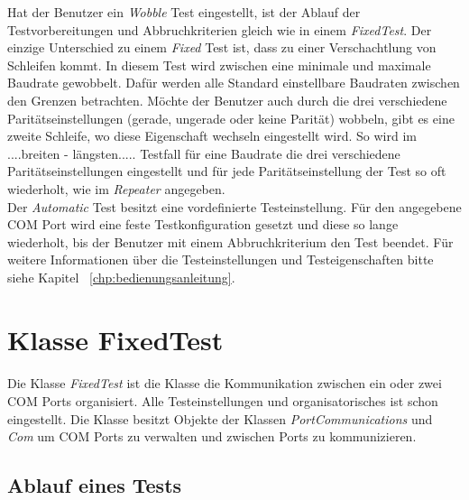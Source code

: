 Hat der Benutzer ein \textit{Wobble} Test eingestellt, ist der Ablauf der Testvorbereitungen und Abbruchkriterien gleich wie in einem \textit{FixedTest}. Der einzige Unterschied zu einem \textit{Fixed} Test ist, dass zu einer Verschachtlung von Schleifen kommt. In diesem Test wird zwischen eine minimale und maximale Baudrate gewobbelt. Dafür werden alle Standard einstellbare Baudraten zwischen den Grenzen betrachten. Möchte der Benutzer auch durch die drei verschiedene Paritätseinstellungen (gerade, ungerade oder keine Parität) wobbeln, gibt es eine zweite Schleife, wo diese Eigenschaft wechseln eingestellt wird. So wird im ....breiten - längsten..... Testfall für eine  Baudrate die drei verschiedene Paritätseinstellungen eingestellt und für jede Paritätseinstellung der Test so oft wiederholt, wie im \textit{Repeater} angegeben.\\

Der \textit{Automatic} Test besitzt eine vordefinierte Testeinstellung. Für den angegebene COM Port wird eine feste Testkonfiguration gesetzt und diese so lange wiederholt, bis der Benutzer mit einem Abbruchkriterium den Test beendet. Für weitere Informationen über die Testeinstellungen und Testeigenschaften bitte siehe Kapitel ~\ref{chp:bedienungsanleitung}.

\newpage


\section{Klasse FixedTest}\label{FixedTextClass}
\paragraph{}
Die Klasse \textit{FixedTest} ist die Klasse die Kommunikation zwischen ein oder zwei COM Ports organisiert. Alle Testeinstellungen und organisatorisches ist schon eingestellt. Die Klasse besitzt Objekte der Klassen \textit{PortCommunications} und \textit{Com} um COM Ports zu verwalten und zwischen Ports zu kommunizieren.\\

\subsection{Ablauf eines Tests}
